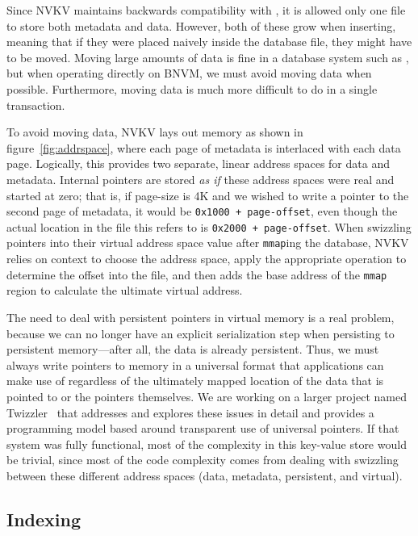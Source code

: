 Since NVKV maintains backwards compatibility with \bdb, it is allowed only one file to
store both metadata and data. However, both of these grow when inserting,
meaning that if they were placed naively inside the database file, they might
have to be moved. Moving large amounts of data is fine in a database system
such as \bdb, but when operating directly on BNVM, we must avoid moving data
when possible. Furthermore, moving data is much more difficult to do in a single
transaction.

To avoid moving data, NVKV lays out memory as shown in
figure~\ref{fig:addrspace}, where each page of metadata is interlaced with each
data page. Logically, this provides two separate, linear address spaces for data
and metadata. Internal pointers are stored \textit{as if} these address spaces
were real and started at zero; that is, if page-size is 4K and we wished to
write a pointer to the second page of metadata, it would be \texttt{0x1000 +
page-offset}, even though the actual location in the file this refers to is
\texttt{0x2000 + page-offset}. When swizzling pointers into their virtual
address space value after \texttt{mmap}ing the database, NVKV relies on context
to choose the address space, apply the appropriate operation to determine the
offset into the file, and then adds the base address of the \texttt{mmap}
region to calculate the ultimate virtual address.

The need to deal with persistent pointers in virtual memory is a real problem,
because we can no longer have an explicit serialization step when persisting to
persistent memory---after all, the data is already persistent. Thus, we must
always write pointers to memory in a universal format that applications can make
use of regardless of the ultimately mapped location of the data that is pointed
to or the pointers themselves. We are working on a larger project named
Twizzler~\cite{bittman-ssrctr-17-01} that addresses and explores these issues in
detail and provides a programming model based around transparent use of
universal pointers. If that system was fully functional, most of the complexity in this
key-value store would be trivial, since most of the code complexity comes from
dealing with swizzling between these different address spaces (data, metadata,
persistent, and virtual).


\subsection{Indexing}

